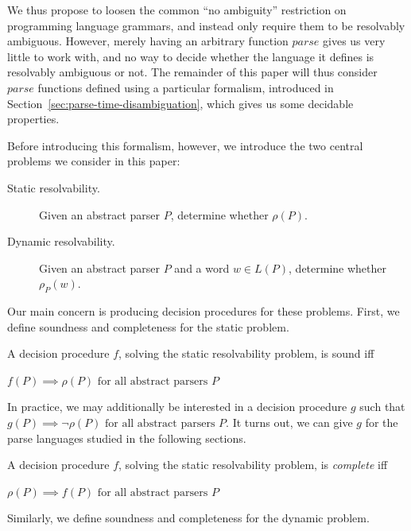 \documentclass[runningheads]{llncs}
\newcommand{\parse}{\mathit{parse}} %
\begin{document}
We thus propose to loosen the common ``no ambiguity'' restriction on programming language grammars, and instead only require them to be resolvably ambiguous. However, merely having an arbitrary function $\parse$ gives us very little to work with, and no way to decide whether the language it defines is resolvably ambiguous or not. The remainder of this paper will thus consider $\parse$ functions defined using a particular formalism, introduced in Section~\ref{sec:parse-time-disambiguation}, which gives us some decidable properties.

Before introducing this formalism, however, we introduce the two central problems we consider in this paper:

\begin{description}
\item[Static resolvability.] Given an abstract parser $P$, determine whether $\rho(P)$.
\item[Dynamic resolvability.] Given an abstract parser $P$ and a word $w \in L(P)$, determine whether $\rho_P(w)$.
\end{description}

\noindent Our main concern is producing decision procedures for these problems. First, we define soundness and completeness for the static problem.

\begin{definition}\label{def:static-procedure-sound}
  A decision procedure $f$, solving the static resolvability problem, is sound iff

  $f(P) \implies \rho(P) \text{ for all abstract parsers } P$
\end{definition}

In practice, we may additionally be interested in a decision procedure
$g$ such that $g(P) \implies \lnot \rho(P) \text{ for all abstract
  parsers } P$. It turns out, we can give $g$ for the parse languages
studied in the following sections.

\begin{definition}\label{def:static-procedure-complete}
  A decision procedure $f$, solving the static resolvability problem, is \emph{complete} iff

  $\rho(P) \implies f(P) \text{ for all abstract parsers } P$
\end{definition}


\noindent Similarly, we define soundness and completeness for the dynamic problem.
\end{document}
